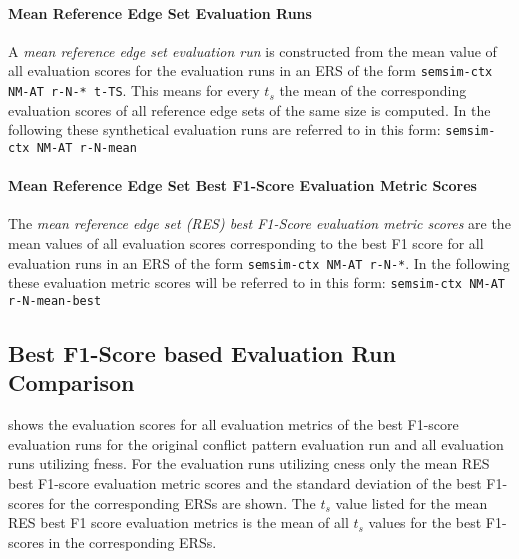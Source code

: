 \documentclass[11pt]{scrreprt}
\begin{document}
{\paragraph{Mean Reference Edge Set Evaluation Runs}
A \textit{mean reference edge set evaluation run} is constructed from the mean value of all evaluation scores for the evaluation runs in an ERS of the form \texttt{semsim-ctx NM-AT r-N-* t-TS}. This means for every \(t_s\) the mean of the corresponding evaluation scores of all reference edge sets of the same size is computed. In the following these synthetical evaluation runs are referred to in this form: \texttt{semsim-ctx NM-AT r-N-mean}

\paragraph{Mean Reference Edge Set Best F1-Score Evaluation Metric Scores}
The \textit{mean reference edge set (RES) best F1-Score evaluation metric scores} are the mean values of all evaluation scores corresponding to the best F1 score for all evaluation runs in an ERS of the form \texttt{semsim-ctx NM-AT r-N-*}. In the following these evaluation metric scores will be referred to in this form: \texttt{semsim-ctx NM-AT r-N-mean-best}



\subsection{Best F1-Score based Evaluation Run Comparison}
\label{sec:best-f1-score-eval-run-comparison}
 shows the evaluation scores for all evaluation metrics of the best F1-score evaluation runs for the original conflict pattern evaluation run and all evaluation runs utilizing \gls{fness}. For the evaluation runs utilizing \gls{cness} only the mean RES best F1-score evaluation metric scores and the standard deviation of the best F1-scores for the corresponding ERSs are shown. The \(t_s\) value listed for the mean RES best F1 score evaluation metrics is the mean of all \(t_s\) values for the best F1-scores in the corresponding ERSs.

}
\end{document}
